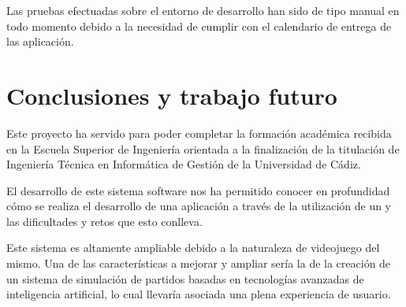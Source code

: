 Las pruebas efectuadas sobre el entorno de desarrollo han sido de tipo manual en
todo momento debido a la necesidad de cumplir con el calendario de entrega de
las aplicación.

\section{Conclusiones y trabajo futuro}
Este proyecto ha servido para poder completar la formación académica recibida en
la Escuela Superior de Ingeniería orientada a la finalización de la titulación
de Ingeniería Técnica en Informática de Gestión de la Universidad de Cádiz.

El desarrollo de este sistema software nos ha permitido conocer en profundidad
cómo se realiza el desarrollo de una aplicación a través de la utilización de un
 y las dificultades y retos que esto conlleva.

Este sistema es altamente ampliable debido a la naturaleza de videojuego del
mismo. Una de las características a mejorar y ampliar sería la de la creación de
un sistema de simulación de partidos basadas en tecnologías avanzadas de
inteligencia artificial, lo cual llevaría asociada una plena experiencia de usuario.